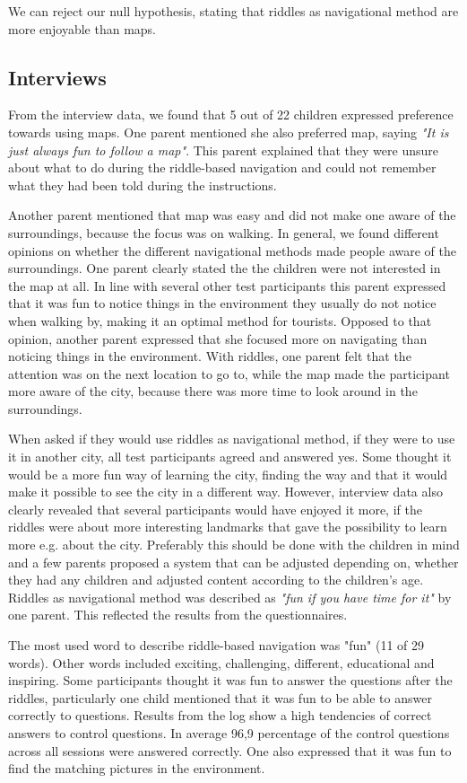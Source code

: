 We can reject our null hypothesis, stating that riddles as navigational method are more enjoyable than maps.

\subsection{Interviews}
From the interview data, we found that 5 out of 22 children expressed preference towards using maps. One parent mentioned she also preferred map, saying \textit{"It is just always fun to follow a map"}. This parent explained that they were unsure about what to do during the riddle-based navigation and could not remember what they had been told during the instructions. 

Another parent mentioned that map was easy and did not make one aware of the surroundings, because the focus was on walking. In general, we found different opinions on whether the different navigational methods made people aware of the surroundings. One parent clearly stated the the children were not interested in the map at all. In line with several other test participants this parent expressed that it was fun to notice things in the environment they usually do not notice when walking by, making it an optimal method for tourists. Opposed to that opinion, another parent expressed that she focused more on navigating than noticing things in the environment. With riddles, one parent felt that the attention was on the next location to go to, while the map made the participant more aware of the city, because there was more time to look around in the surroundings. 

When asked if they would use riddles as navigational method, if they were to use it in another city, all test participants agreed and answered yes. Some thought it would be a more fun way of learning the city, finding the way and that it would make it possible to see the city in a different way. However, interview data also clearly revealed that several participants would have enjoyed it more, if the riddles were about more interesting landmarks that gave the possibility to learn more e.g. about the city. Preferably this should be done with the children in mind and a few parents proposed a system that can be adjusted depending on, whether they had any children and adjusted content according to the children’s age. Riddles as navigational method was described as \textit{"fun if you have time for it"} by one parent. This reflected the results from the questionnaires. 

The most used word to describe riddle-based navigation was "fun" (11 of 29 words). Other words included exciting, challenging, different, educational and inspiring. Some participants thought it was fun to answer the questions after the riddles, particularly one child mentioned that it was fun to be able to answer correctly to questions. Results from the log show a high tendencies of correct answers to control questions. In average 96,9 percentage of the control questions across all sessions were answered correctly. One also expressed that it was fun to find the matching pictures in the environment. 

